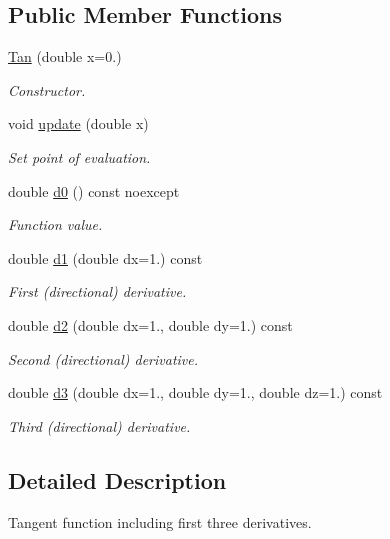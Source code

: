 \subsection*{Public Member Functions}
\begin{DoxyCompactItemize}
\item 
\hyperlink{structfuncy_1_1Tan_a59c80760eee19c36e9d0a3526da9de48}{Tan} (double x=0.)
\begin{DoxyCompactList}\small\item\em Constructor. \end{DoxyCompactList}\item 
void \hyperlink{structfuncy_1_1Tan_afc1b55dec67689ea518844ccae47a862}{update} (double x)
\begin{DoxyCompactList}\small\item\em Set point of evaluation. \end{DoxyCompactList}\item 
double \hyperlink{structfuncy_1_1Tan_a807f48721350e4a46c78b0cae6d47d08}{d0} () const noexcept
\begin{DoxyCompactList}\small\item\em Function value. \end{DoxyCompactList}\item 
double \hyperlink{structfuncy_1_1Tan_afb5539633ba5ea3cf35ec53d345d5817}{d1} (double dx=1.) const 
\begin{DoxyCompactList}\small\item\em First (directional) derivative. \end{DoxyCompactList}\item 
double \hyperlink{structfuncy_1_1Tan_ad23517a856df48d01371dec220455a50}{d2} (double dx=1., double dy=1.) const 
\begin{DoxyCompactList}\small\item\em Second (directional) derivative. \end{DoxyCompactList}\item 
double \hyperlink{structfuncy_1_1Tan_a0865054a767883d7d833b44d651591c2}{d3} (double dx=1., double dy=1., double dz=1.) const 
\begin{DoxyCompactList}\small\item\em Third (directional) derivative. \end{DoxyCompactList}\end{DoxyCompactItemize}


\subsection{Detailed Description}
Tangent function including first three derivatives. 

